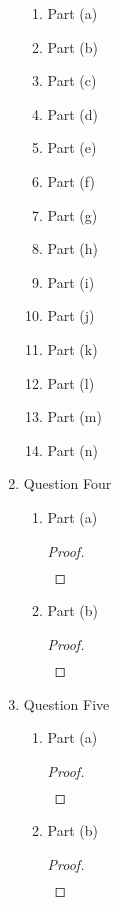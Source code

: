 \documentclass{article}
\begin{document}
\begin{enumerate}
\begin{enumerate}
        \item Part (a)
        \item Part (b)
        \item Part (c)
        \item Part (d)
        \item Part (e)
        \item Part (f)
        \item Part (g)
        \item Part (h)
        \item Part (i)
        \item Part (j)
        \item Part (k)
        \item Part (l)
        \item Part (m)
        \item Part (n)
    \end{enumerate}
    \item Question Four
    \begin{enumerate}
        \item Part (a)
        \begin{proof}
            \begin{align}
                &
            \end{align}
        \end{proof}
        \item Part (b)
        \begin{proof}
            \begin{align}
                &
            \end{align}
        \end{proof}
    \end{enumerate}
    \item Question Five
    \begin{enumerate}
        \item Part (a)
        \begin{proof}
            \begin{align}
                &
            \end{align}
        \end{proof}
        \item Part (b)
        \begin{proof}
            \begin{align}
                &
            \end{align}
        \end{proof}
    \end{enumerate}

\end{enumerate}
\end{document}
